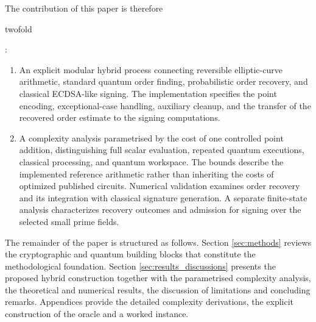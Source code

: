 The contribution of this paper is therefore \begin{revision} twofold\end{revision}:
\begin{enumerate}
    \item 
        \begin{revision}
            An explicit modular hybrid process connecting reversible elliptic-curve arithmetic, standard quantum order finding, probabilistic order recovery, and classical ECDSA-like signing. The implementation specifies the point encoding, exceptional-case handling, auxiliary cleanup, and the transfer of the recovered order estimate to the signing computations.
        \end{revision}
    \item 
        \begin{revision} 
            A complexity analysis parametrised by the cost of one controlled point addition, distinguishing full scalar evaluation, repeated quantum executions, classical processing, and quantum workspace. The bounds describe the implemented reference arithmetic rather than inheriting the costs of optimized published circuits. Numerical validation examines order recovery and its integration with classical signature generation. A separate finite-state analysis characterizes recovery outcomes and admission for signing over the selected small prime fields.
        \end{revision}
\end{enumerate}

The remainder of the paper is structured as follows. Section \ref{sec:methods} reviews the cryptographic and quantum building blocks that constitute the methodological foundation. Section \ref{sec:results_discussions} presents the proposed hybrid construction together with the parametrised complexity analysis, the theoretical and numerical results, the discussion of limitations and concluding remarks. Appendices provide the detailed complexity derivations, the explicit construction of the oracle and a worked instance.